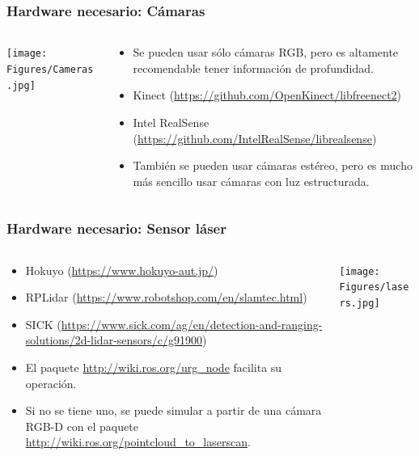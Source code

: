 \documentclass[10pt,spanish,aspectratio=1610]{beamer}
\begin{document}
\begin{frame}\frametitle{Hardware necesario: Cámaras}
  \begin{columns}
    \begin{column}{0.45\textwidth}
      \texttt{[image: Figures/Cameras.jpg]}
    \end{column}
    \begin{column}{0.5\textwidth}
      \begin{itemize}
      \item Se pueden usar sólo cámaras RGB, pero es altamente recomendable tener información de profundidad.
      \item Kinect (\url{https://github.com/OpenKinect/libfreenect2})
      \item Intel RealSense (\url{https://github.com/IntelRealSense/librealsense})
      \item También se pueden usar cámaras estéreo, pero es mucho más sencillo usar cámaras con luz estructurada.
      \end{itemize}
    \end{column}
  \end{columns}
\end{frame}

\begin{frame}\frametitle{Hardware necesario: Sensor láser}
  \begin{columns}
    \begin{column}{0.5\textwidth}
      \begin{itemize}
      \item Hokuyo (\url{https://www.hokuyo-aut.jp/})
      \item RPLidar (\url{https://www.robotshop.com/en/slamtec.html})
      \item SICK (\url{https://www.sick.com/ag/en/detection-and-ranging-solutions/2d-lidar-sensors/c/g91900})
      \item El paquete \url{http://wiki.ros.org/urg_node} facilita su operación.
      \item Si no se tiene uno, se puede simular a partir de una cámara RGB-D con el paquete \url{http://wiki.ros.org/pointcloud_to_laserscan}.
      \end{itemize}
    \end{column}
    \begin{column}{0.4\textwidth}
      \texttt{[image: Figures/lasers.jpg]}
    \end{column}
  \end{columns}
\end{frame}
\end{document}
